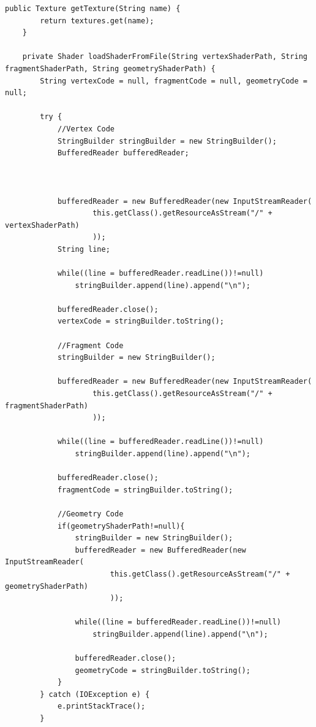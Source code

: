 \documentclass[12pt, 
openright, 
oneside, 
a4paper,    
brazil]{facom-ufu-abntex2}
\begin{document}
\begin{apendicesenv}
\begin{lstlisting}[caption=Classe Resource Manager]
    public Texture getTexture(String name) {
        return textures.get(name);
    }

    private Shader loadShaderFromFile(String vertexShaderPath, String fragmentShaderPath, String geometryShaderPath) {
        String vertexCode = null, fragmentCode = null, geometryCode = null;
         
        try {
            //Vertex Code
            StringBuilder stringBuilder = new StringBuilder();
            BufferedReader bufferedReader;
             
             
             
            bufferedReader = new BufferedReader(new InputStreamReader(
                    this.getClass().getResourceAsStream("/" + vertexShaderPath)
                    )); 
            String line;
             
            while((line = bufferedReader.readLine())!=null)
                stringBuilder.append(line).append("\n");
             
            bufferedReader.close();
            vertexCode = stringBuilder.toString();
             
            //Fragment Code
            stringBuilder = new StringBuilder();
             
            bufferedReader = new BufferedReader(new InputStreamReader(
                    this.getClass().getResourceAsStream("/" + fragmentShaderPath)
                    )); 
             
            while((line = bufferedReader.readLine())!=null)
                stringBuilder.append(line).append("\n");
             
            bufferedReader.close();
            fragmentCode = stringBuilder.toString();
             
            //Geometry Code
            if(geometryShaderPath!=null){
                stringBuilder = new StringBuilder();
                bufferedReader = new BufferedReader(new InputStreamReader(
                        this.getClass().getResourceAsStream("/" + geometryShaderPath)
                        )); 
                 
                while((line = bufferedReader.readLine())!=null)
                    stringBuilder.append(line).append("\n");
                 
                bufferedReader.close();
                geometryCode = stringBuilder.toString();
            }
        } catch (IOException e) {
            e.printStackTrace();
        }
         

\end{lstlisting}
\end{apendicesenv}
\end{document}

